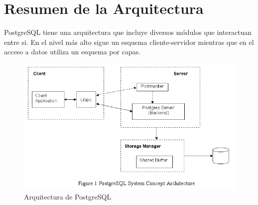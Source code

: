 

\newpage

\section{Resumen de la Arquitectura}

PostgreSQL tiene una arquitectura que incluye diversos módulos que interactuan entre si. En el nivel más alto sigue un esquema cliente-servidor mientras que en el acceso a datos utiliza un esquema por capas.

\begin{figure}[ht!]
   \centering
   \includegraphics[scale=0.5]{imagenes/system_concept_architecture.png}
   \caption{Arquitectura de PostgreSQL}\label{graf:pg-achitecture}
\end{figure}

